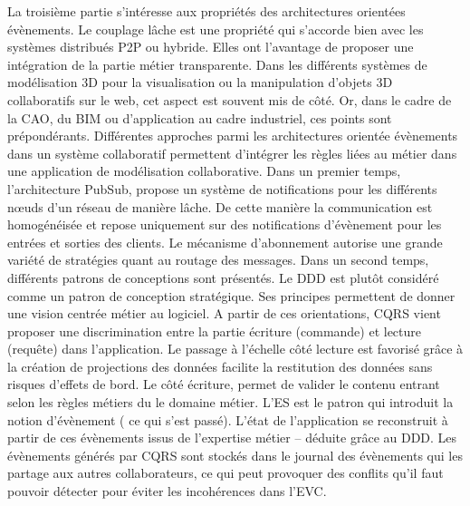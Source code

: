 La troisième partie s'intéresse aux propriétés des architectures orientées 
évènements. Le couplage lâche est une propriété 
qui s'accorde bien avec les systèmes distribués \gls{P2P} ou hybride. Elles ont 
l'avantage de proposer une intégration de la partie métier transparente. Dans les 
différents 
systèmes de modélisation 3D pour la visualisation ou la manipulation d'objets 3D 
collaboratifs sur le web, cet aspect est souvent mis de côté. Or, dans le cadre de 
la \gls{CAO}, du \gls{BIM} ou d'application au cadre industriel, ces points sont 
prépondérants.
Différentes approches parmi les architectures orientée évènements dans un 
système collaboratif permettent d'intégrer les règles liées au métier dans une 
application de modélisation collaborative. Dans un 
premier temps, l'architecture \gls{PubSub}, propose un système de notifications 
pour les différents 
n\oe uds d'un réseau de manière lâche. De cette manière la communication est 
homogénéisée et repose uniquement sur des notifications d'évènement pour les 
entrées et sorties des clients. Le mécanisme d'abonnement autorise une 
grande variété de stratégies quant au routage des messages.
Dans un second temps, différents patrons de conceptions sont présentés. Le 
\gls{DDD} est plutôt considéré comme un patron de conception stratégique. Ses 
principes permettent de donner une vision centrée métier au logiciel. 
A partir de ces orientations, \gls{CQRS} vient proposer une discrimination entre la 
partie écriture (commande) et lecture (requête) dans l'application. Le passage à 
l'échelle côté lecture est favorisé grâce à la création de projections des données 
facilite la restitution des données sans risques d'effets de bord. 
Le côté écriture, permet de valider le contenu entrant selon les règles métiers du 
le domaine métier. L'\gls{ES} est le patron qui introduit la notion d'évènement (\og 
ce qui s'est passé\fg{}). L'état de l'application se reconstruit à 
partir de ces évènements issus de l'expertise métier -- déduite grâce au \gls{DDD}. 
Les évènements générés par \gls{CQRS} sont stockés dans le journal des 
évènements qui les partage aux autres collaborateurs, ce qui peut 
provoquer des conflits qu'il faut pouvoir détecter pour éviter les incohérences dans 
l'\gls{EVC}. 

